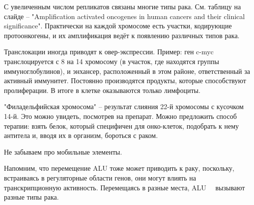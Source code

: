 \documentclass[main.tex]{subfiles}
\begin{document}
С увеличенным числом репликатов связаны многие типы рака.
См. таблицу на слайде -- "Amplification activated oncogenes in human cancers and their clinical significance".
Практически на каждой хромосоме есть участки, кодирующие протоонкогены, и их амплификация ведёт к появлению различных типов рака.

Транслокации иногда приводят к овер-экспрессии.
Пример: ген c-myc транслоцируется с 8 на 14 хромосому (в участок, где находятся группы иммуноглобулинов), и энхансер, расположенный в этом районе, ответственный за активный иммунитет.
Постоянно производятся продукты, которые способствуют пролиферации.
В итоге в клетке оказываются только лимфоциты.

"Филадельфийская хромосома"\hspace{0pt} -- результат слияния 22-й хромосомы с кусочком 14-й.
Это можно увидеть, посмотрев на препарат.
Можно предложить способ терапии: взять белок, который специфичен для онко-клеток, подобрать к нему антитела и, вводя их в организм, бороться с раком.

Не забываем про мобильные элементы.

Напомним, что перемещение ALU тоже может приводить к раку, поскольку, встраиваясь в регуляторные области генов, они могут влиять на транскрипционную активность.
Перемещаясь в разные места, ALU   вызывают разные типы рака.
\end{document}
